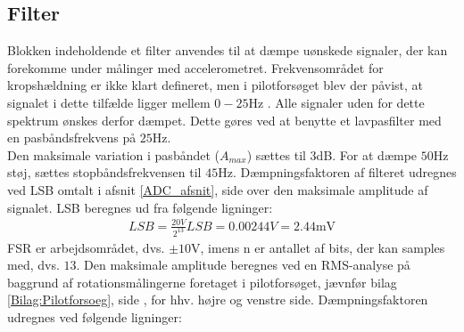 \subsection{Filter}\label{FilterAfs}
Blokken indeholdende et filter anvendes til at dæmpe uønskede signaler, der kan forekomme under målinger med accelerometret. Frekvensområdet for kropshældning er ikke klart defineret, men i pilotforsøget blev der påvist, at signalet i dette tilfælde ligger mellem $0-25$Hz \cite{Martinez-Mendez2011}. Alle signaler uden for dette spektrum ønskes derfor dæmpet. Dette gøres ved at benytte et lavpasfilter med en pasbåndsfrekvens på $25$Hz. \\
Den maksimale variation i pasbåndet ($A_{max}$) sættes til $3$dB. For at dæmpe $50$Hz støj, sættes stopbåndsfrekvensen til $45$Hz. Dæmpningsfaktoren af filteret udregnes ved LSB omtalt i afsnit \ref{ADC_afsnit}, side \pageref{ADC_afsnit} over den maksimale amplitude af signalet. LSB beregnes ud fra følgende ligninger: \\
\begin{align}
	LSB = \frac{20V}{2^{13}}
	LSB = 0.00244V = 2.44\text{mV}
\end{align}
FSR er arbejdsområdet, dvs. $\pm10$V, imens n er antallet af bits, der kan samples med, dvs. $13$. Den maksimale amplitude beregnes ved en RMS-analyse på baggrund af rotationsmålingerne foretaget i pilotforsøget, jævnfør bilag \ref{Bilag:Pilotforsoeg}, side \pageref{Bilag:Pilotforsoeg}, for hhv. højre og venstre side. Dæmpningsfaktoren udregnes ved følgende ligninger:

